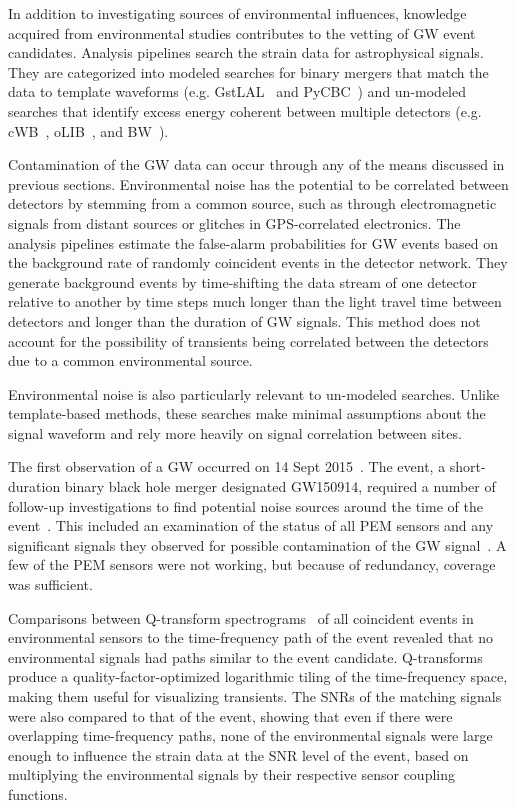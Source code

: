 In addition to investigating sources of environmental influences, knowledge acquired from environmental studies contributes to the vetting of \ac{GW} event candidates.
Analysis pipelines search the strain data for astrophysical signals.
They are categorized into modeled searches for binary mergers that match the data to template waveforms (e.g. GstLAL~\citep{Cannon_2012} and PyCBC~\citep{Usman_2016}) and un-modeled searches that identify excess energy coherent between multiple detectors (e.g. cWB~\citep{Klimenko_2008}, oLIB~\citep{Lynch_2017}, and BW~\citep{Cornish_2015}).

Contamination of the \ac{GW} data can occur through any of the means discussed in previous sections.
Environmental noise has the potential to be correlated between detectors by stemming from a common source, such as through electromagnetic signals from distant sources or glitches in GPS-correlated electronics.
The analysis pipelines estimate the false-alarm probabilities for GW events based on the background rate of randomly coincident events in the detector network.
They generate background events by time-shifting the data stream of one detector relative to another by time steps much longer than the light travel time between detectors and longer than the duration of GW signals.%
This method does not account for the possibility of transients being correlated between the detectors due to a common environmental source.

Environmental noise is also particularly relevant to un-modeled searches. Unlike template-based methods, these searches make minimal assumptions about the signal waveform and rely more heavily on signal correlation between sites.

The first observation of a \ac{GW} occurred on 14 Sept 2015~\citep{gw150914}.
The event, a short-duration binary black hole merger designated GW150914, required a number of follow-up investigations to find potential noise sources around the time of the event~\citep{Detchar_2016}.
This included an examination of the status of all \ac{PEM} sensors and any significant signals they observed for possible contamination of the GW signal~\citep{Schofield_150914}.
A few of the \ac{PEM} sensors were not working, but because of redundancy, coverage was sufficient.

Comparisons between Q-transform spectrograms~\citep{Chatterji_2004} of all coincident events in environmental sensors to the time-frequency path of the event revealed that no environmental signals had paths similar to the event candidate.
Q-transforms produce a quality-factor-optimized logarithmic tiling of the time-frequency space, making them useful for visualizing transients.
The \acp{SNR} of the matching signals were also compared to that of the event, showing that even if there were overlapping time-frequency paths, none of the environmental signals were large enough to influence the strain data at the \ac{SNR} level of the event, based on multiplying the environmental signals by their respective sensor coupling functions.

